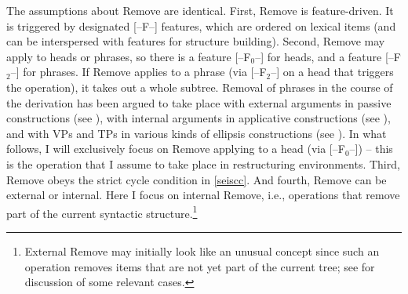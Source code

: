 \documentclass[output=paper]{langsci/langscibook}
\begin{document}
The assumptions about Remove are identical. First, Remove is feature-driven.
It is triggered by designated [--F--] features, which are ordered on lexical
items (and can be interspersed with features for structure building). Second,
Remove may apply to heads or phrases, so there is a feature [--F$_0$--] for
heads, and a feature [--F$_2$--] for phrases. If Remove applies to a phrase
(via [--F$_2$--] on a head that triggers the operation), it takes out a whole
subtree.  Removal of phrases in the course of the derivation has been argued to
take place with external arguments in  passive constructions (see
\citealt{Mueller:16:sho}), with internal arguments in applicative constructions
(see \citealt{Mueller:17:fdm}), and with VPs and TPs in various kinds of
ellipsis constructions  (see \citealt{Murphy:15,Murphy&Mueller:16}). In what
follows, I will exclusively focus on Remove applying to a head (via
[--F$_0$--]) -- this is the operation that I assume to take place in
restructuring environments.  Third, Remove obeys the strict cycle condition in
\eqref{seiscc}. And fourth, Remove can be external or internal. Here I focus on
internal Remove, i.e., operations that remove part of the current syntactic
structure.\footnote{External Remove may initially look like an unusual concept
    since such an operation removes items that are not yet part of the current
tree; see \citet{Mueller:16:sho,Mueller:17:fdm} for discussion of some relevant
cases.}
\end{document}
